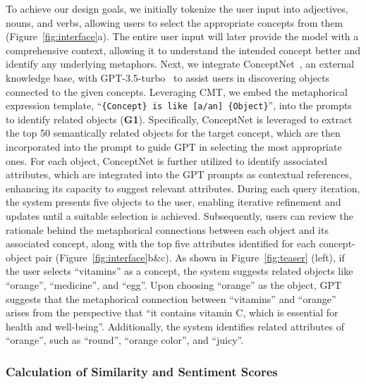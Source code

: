 To achieve our design goals, we initially tokenize the user input into adjectives, nouns, and verbs, allowing users to select the appropriate concepts from them (Figure~\ref{fig:interface}a).
The entire user input will later provide the model with a comprehensive context, allowing it to understand the intended concept better and identify any underlying metaphors.
Next, we integrate ConceptNet~\cite{10.5555/3298023.3298212}, an external knowledge base, with GPT-3.5-turbo~\cite{NEURIPS2020_1457c0d6} to assist users in discovering objects connected to the given concepts.
Leveraging CMT, we embed the metaphorical expression template, ``\texttt{\{Concept\} is like [a/an] \{Object\}}'', into the prompts to identify related objects (\textbf{G1}).
Specifically, ConceptNet is leveraged to extract the top 50 semantically related objects for the target concept, which are then incorporated into the prompt to guide GPT in selecting the most appropriate ones.
For each object, ConceptNet is further utilized to identify associated attributes, which are integrated into the GPT prompts as contextual references, enhancing its capacity to suggest relevant attributes.
During each query iteration, the system presents five objects to the user, enabling iterative refinement and updates until a suitable selection is achieved.
Subsequently, users can review the rationale behind the metaphorical connections between each object and its associated concept, along with the top five attributes identified for each concept-object pair (Figure~\ref{fig:interface}b\&c).
As shown in Figure~\ref{fig:teaser} (left), if the user selects ``vitamins'' as a concept, the system suggests related objects like ``orange'', ``medicine'', and ``egg''.
Upon choosing ``orange'' as the object, GPT suggests that the metaphorical connection between ``vitamins'' and ``orange'' arises from the perspective that ``it contains vitamin C, which is essential for health and well-being''. 
Additionally, the system identifies related attributes of ``orange'', such as ``round'', ``orange color'', and ``juicy''.



\subsubsection{Calculation of Similarity and Sentiment Scores}




